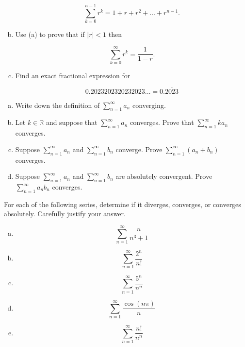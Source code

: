 \documentclass[11pt]{exam}
\theoremstyle{definition}
\begin{document}
\begin{questions}
\begin{enumerate}[(a)]
$$\sum_{k=0}^{n-1} r^k = 1 + r + r^2 + \dots + r^{n-1}.$$

\vspace{1in}
\item Use (a) to prove that if $|r| < 1$ then

$$\sum_{k=0}^\infty r^k = \frac{1}{1-r}.$$
\vspace{2in}

\item Find an exact fractional expression for

$$0.2023202320232023\dots = 0.\overline{2023}$$

\end{enumerate}

\newpage
\question[10]\mbox{}

\begin{enumerate}[(a)]
\item  Write down the definition of $\sum_{n=1}^\infty a_n$ converging.
\vspace{1in}
\item  Let $k\in\mathbb R$ and suppose that $\sum_{n=1}^\infty a_n$ converges.  Prove that $\sum_{n=1}^\infty ka_n$ converges.
\vspace{2in}
\item  Suppose $\sum_{n=1}^\infty a_n$ and $\sum_{n=1}^\infty b_n$ converge.  Prove $\sum_{n=1}^\infty (a_n+b_n)$ converges.
\vspace{2in}
\item  Suppose $\sum_{n=1}^\infty a_n$ and $\sum_{n=1}^\infty b_n$ are absolutely convergent.  Prove $\sum_{n=1}^\infty a_nb_n$ converges.
\end{enumerate}

\newpage
\question[10]\mbox{}

For each of the following series, determine if it diverges, converges, or converges absolutely.
Carefully justify your answer.

\begin{enumerate}[(a)]
\item  
$$\sum_{n=1}^\infty \frac{n}{n^3+1}$$
\vspace{0.9in}
\item
$$\sum_{n=1}^\infty \frac{2^n}{n!}$$
\vspace{0.9in}
\item
$$\sum_{n=1}^\infty \frac{5^n}{n^n}$$
\vspace{0.9in}
\item
$$\sum_{n=1}^\infty \frac{\cos(n\pi)}{n}$$
\vspace{0.9in}
\item
$$\sum_{n=1}^\infty \frac{n!}{n^n}$$
\end{enumerate}


\end{questions}
\end{document}
